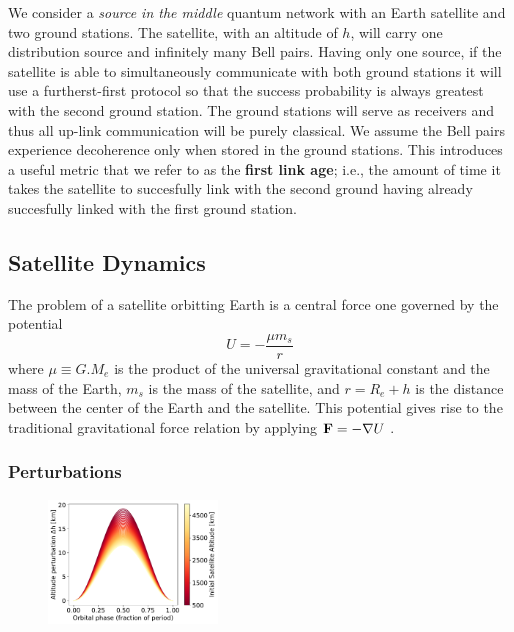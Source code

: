 We consider a \textit{source in the middle} quantum network with an Earth satellite and two ground stations. The satellite, with an altitude of $h$, will carry one distribution source and infinitely many Bell pairs. Having only one source, if the satellite is able to simultaneously communicate with both ground stations it will use a furtherst-first protocol so that the success probability is always greatest with the second ground station. The ground stations will serve as receivers and thus all up-link communication will be purely classical. We assume the Bell pairs experience decoherence only when stored in the ground stations. This introduces a useful metric that we refer to as the \textbf{first link age}; i.e., the amount of time it takes the satellite to succesfully link with the second ground having already succesfully linked with the first ground station.


\subsection{Satellite Dynamics}

The problem of a satellite orbitting Earth is a central force one governed by the potential
\begin{equation}
    U = - \frac{\mu m_s}{r}
\end{equation}
where $\mu \equiv G . M_e$ is the product of the universal gravitational constant and the mass of the Earth, $m_s$ is the mass of the satellite, and $r = R_e + h$ is the distance between the center of the Earth and the satellite. This potential gives rise to the traditional gravitational force relation by applying $\vb{F} = -\nabla U$ \cite{curtis2005}.

\subsubsection{Perturbations}

\begin{figure}
    \centering
    \vspace{-.1\baselineskip}
    \includegraphics[width=0.4\textwidth]{figures/delta-h.pdf}
    \caption{}
    \label{fig:delta-h}
\end{figure}

